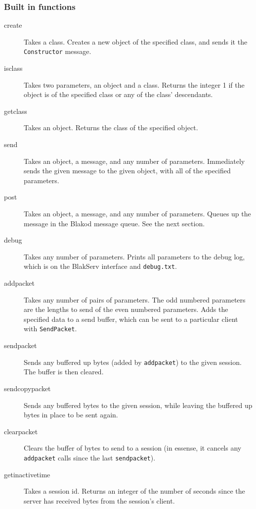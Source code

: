 \subsubsection{Built in functions}

\begin{description}

\item[create] Takes a class.  Creates a new object of the specified class, and sends it 
the \texttt{Constructor} message.
\item[isclass] Takes two parameters, an object and a class.  Returns the 
integer 1 if the object is of the specified class or any of the class' descendants.

\item[getclass] Takes an object.  Returns the class of the specified object.

\item[send] Takes an object, a message, and any number of parameters.  
Immediately sends the given message to the given object, with all of the specified parameters.
\item[post] Takes an object, a message, and any number of parameters.
Queues up the message in the Blakod message queue.  See the next section.

\item[debug] Takes any number of parameters.
Prints all parameters to the debug log, which is on the BlakServ
interface and \texttt{debug.txt}.

\item[addpacket] Takes any number of pairs of parameters.  The odd numbered
parameters are the lengths to send of the even numbered parameters.  Adds
the specified data to a send buffer, which can be sent to a particular client
with \texttt{SendPacket}.

\item[sendpacket] Sends any buffered up bytes (added by \texttt{addpacket}) to
the given session.  The buffer is then cleared.

\item[sendcopypacket] Sends any buffered bytes to the given session, while leaving
the buffered up bytes in place to be sent again.
 
\item[clearpacket] Clears the buffer of bytes to send to a session (in essense,
it cancels any \texttt{addpacket} calls since the last \texttt{sendpacket}).

\item[getinactivetime] Takes a session id.  Returns an integer of the number
of seconds since the server has received bytes from the session's client.
   

\end{description}
